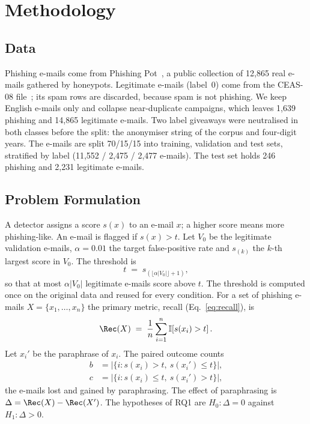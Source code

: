 \section{Methodology}
\label{sec:method}

\subsection{Data}
\label{sec:method:data}
Phishing e-mails come from Phishing Pot~\cite{peixoto_phishing_pot_2026}, a public collection of 12,865 real e-mails gathered by honeypots. Legitimate e-mails (label~0) come from the CEAS-08 file~\cite{php4life_phishing_dataset}; its spam rows are discarded, because spam is not phishing. We keep English e-mails only and collapse near-duplicate campaigns, which leaves 1,639 phishing and 14,865 legitimate e-mails. Two label giveaways were neutralised in both classes before the split: the anonymiser string of the corpus and four-digit years. The e-mails are split 70/15/15 into training, validation and test sets, stratified by label (11,552 / 2,475 / 2,477 e-mails). The test set holds 246 phishing and 2,231 legitimate e-mails.

\subsection{Problem Formulation}
\label{sec:method:problem}
A detector assigns a score $s(x)$ to an e-mail $x$; a higher score means more phishing-like. An e-mail is flagged if $s(x)>t$. Let $V_0$ be the legitimate validation e-mails, $\alpha=0.01$ the target false-positive rate and $s_{(k)}$ the $k$-th largest score in $V_0$. The threshold is
\begin{equation}
  t \;=\; s_{(\lfloor \alpha |V_0| \rfloor + 1)},
  \label{eq:threshold}
\end{equation}
so that at most $\alpha|V_0|$ legitimate e-mails score above $t$. The threshold is computed once on the original data and reused for every condition. For a set of phishing e-mails $X=\{x_1,\dots,x_n\}$ the primary metric, recall (Eq.~\eqref{eq:recall}), is
\begin{equation}
  \Rec(X) \;=\; \frac{1}{n}\sum_{i=1}^{n}\mathbb{I}\!\left[s(x_i)>t\right].
  \label{eq:recall}
\end{equation}
Let $x_i'$ be the paraphrase of $x_i$. The paired outcome counts
\begin{align}
  b&=\bigl|\{i: s(x_i)>t,\ s(x_i')\le t\}\bigr|,\nonumber\\
  c&=\bigl|\{i: s(x_i)\le t,\ s(x_i')>t\}\bigr|,
  \label{eq:discordant}
\end{align}
the e-mails lost and gained by paraphrasing. The effect of paraphrasing is $\Delta=\Rec(X)-\Rec(X')$. The hypotheses of RQ1 are $H_0\colon \Delta=0$ against $H_1\colon \Delta>0$.

